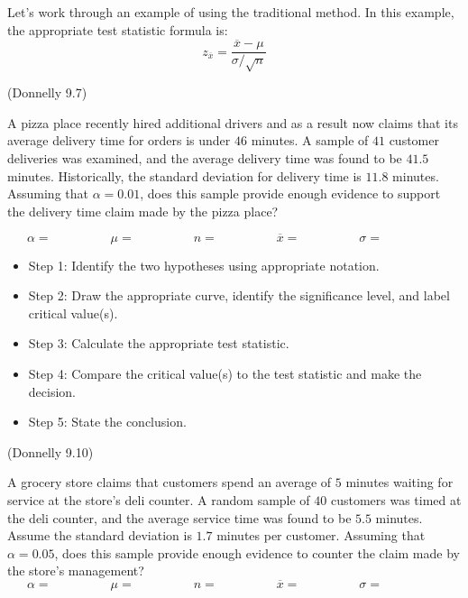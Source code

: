 \documentclass[12pt, letterpaper]{article}
\newcounter{exercise}
\theoremstyle{definition}
\begin{document}
\noindent Let's work through an example of using the traditional method.  In this example, the appropriate test statistic formula is:
$$ z_{\overline{x}} = \frac{\overline{x}-\mu }{\sigma/\sqrt{n}} $$

\begin{exercise} (Donnelly 9.7)

A pizza place recently hired additional drivers and as a result now claims that its average delivery time for orders is under $46$ minutes.  A sample of $41$ customer deliveries was examined, and the average delivery time was found to be $41.5$ minutes.  Historically, the standard deviation for delivery time is $11.8$ minutes.  Assuming that $\alpha = 0.01$, does this sample provide enough evidence to support the delivery time claim made by the pizza place?

$$ \alpha=~~~~~~~~~~~~~~~~~~~~~ \mu = ~~~~~~~~~~~~~~~~~~~~~ n = ~~~~~~~~~~~~~~~~~~~~~ \overline{x} = ~~~~~~~~~~~~~~~~~~~~~ \sigma = ~~~~~~~~~~~~~~~~~~~~~ $$

\end{exercise}

\begin{itemize}
\item Step 1:  Identify the two hypotheses using appropriate notation.

\vfill

\item Step 2:  Draw the appropriate curve, identify the significance level, and label critical value(s).

\vfill

\item Step 3:  Calculate the appropriate test statistic.

\vfill

\item Step 4:  Compare the critical value(s) to the test statistic and make the decision.

\vfill

\item Step 5:  State the conclusion.

\vfill

\end{itemize}

\newpage


\begin{exercise}  (Donnelly 9.10)

A grocery store claims that customers spend an average of $5$ minutes waiting for service at the store's deli counter.  A random sample of $40$ customers was timed at the deli counter, and the average service time was found to be $5.5$ minutes.  Assume the standard deviation is $1.7$ minutes per customer.  Assuming that $\alpha = 0.05$, does this sample provide enough evidence to counter the claim made by the store's management?
$$ \alpha=~~~~~~~~~~~~~~~~~~~~~ \mu = ~~~~~~~~~~~~~~~~~~~~~ n = ~~~~~~~~~~~~~~~~~~~~~ \overline{x} = ~~~~~~~~~~~~~~~~~~~~~ \sigma = ~~~~~~~~~~~~~~~~~~~~~ $$

\end{exercise}
\end{document}
